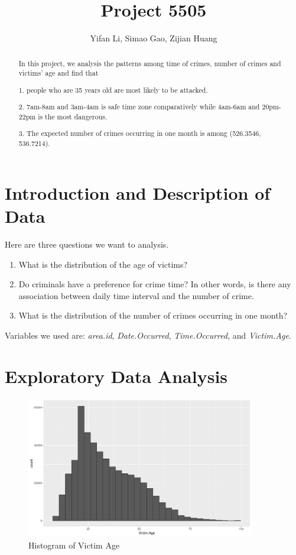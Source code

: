 \documentclass[UTF8]{article}
\title{Project 5505}
\author{Yifan Li, Simao Gao, Zijian Huang}
\begin{document}
\maketitle

\begin{abstract}
    
    In this project, we analysis the patterns among time of crimes, number of crimes and victims' age and find that 
    
    1. people who are 35 years old are most likely to be attacked. 
    
    2. 7am-8am and 3am-4am is safe time zone comparatively while 4am-6am and 20pm-22pm is the most dangerous. 

    3. The expected number of crimes occurring in one month is among (526.3546, 536.7214).



\end{abstract}


\section{Introduction and Description of Data}

Here are three questions we want to analysis.

\begin{enumerate}
    \item What is the distribution of the age of victims?
    \item Do criminals have a preference for crime time? In other words, is there any association between daily time interval and the number of crime.
    \item What is the distribution of the number of crimes occurring in one month?
\end{enumerate}

Variables we used are: \textit{area.id}, \textit{Date.Occurred}, \textit{Time.Occurred}, and \textit{Victim.Age}.

\section{Exploratory Data Analysis}

\begin{figure}[htb]
    \includegraphics[width=10cm,height=6.18cm]{../image/1.pdf}
    \caption{Histogram of Victim Age}\label{fig:Victim_Age} 
\end{figure}
\end{document}

